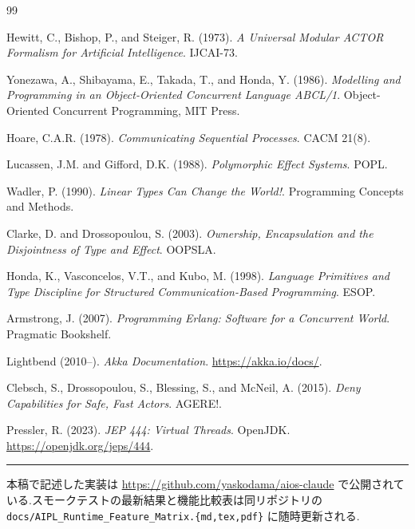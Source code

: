 \documentclass[11pt,a4paper]{article}
\newcommand{\code}[1]{\texttt{\small #1}}
\begin{document}
\begin{thebibliography}{99}
\small

Hewitt, C., Bishop, P., and Steiger, R. (1973). \emph{A Universal
Modular ACTOR Formalism for Artificial Intelligence}. IJCAI-73.

Yonezawa, A., Shibayama, E., Takada, T., and Honda, Y. (1986).
\emph{Modelling and Programming in an Object-Oriented Concurrent
Language ABCL/1}.  Object-Oriented Concurrent Programming, MIT Press.

Hoare, C.A.R. (1978). \emph{Communicating Sequential Processes}.
CACM 21(8).

Lucassen, J.M. and Gifford, D.K. (1988). \emph{Polymorphic Effect
Systems}. POPL.

Wadler, P. (1990). \emph{Linear Types Can Change the World!}.
Programming Concepts and Methods.

Clarke, D. and Drossopoulou, S. (2003). \emph{Ownership, Encapsulation
and the Disjointness of Type and Effect}. OOPSLA.

Honda, K., Vasconcelos, V.T., and Kubo, M. (1998). \emph{Language
Primitives and Type Discipline for Structured Communication-Based
Programming}. ESOP.

Armstrong, J. (2007). \emph{Programming Erlang: Software for a
Concurrent World}. Pragmatic Bookshelf.

Lightbend (2010--). \emph{Akka Documentation}.
\url{https://akka.io/docs/}.

Clebsch, S., Drossopoulou, S., Blessing, S., and McNeil, A. (2015).
\emph{Deny Capabilities for Safe, Fast Actors}. AGERE!.

Pressler, R. (2023). \emph{JEP 444: Virtual Threads}. OpenJDK.
\url{https://openjdk.org/jeps/444}.
\end{thebibliography}

\bigskip
\hrule
\smallskip
\noindent\small
本稿で記述した実装は \url{https://github.com/yaskodama/aios-claude}
で公開されている.スモークテストの最新結果と機能比較表は同リポジトリの
\code{docs/AIPL\_Runtime\_Feature\_Matrix.\{md,tex,pdf\}} に随時更新される.
\end{document}
